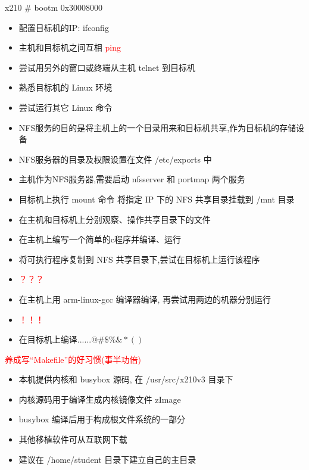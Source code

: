    x210 \# bootm 0x30008000
\endslide

\begin{itemize}
  \item 配置目标机的IP: ifconfig
  \item 主机和目标机之间互相 \textcolor{red}{ping}
  \item 尝试用另外的窗口或终端从主机 telnet 到目标机
  \item 熟悉目标机的 Linux 环境
  \item 尝试运行其它 Linux 命令
\end{itemize}
\endslide

\begin{itemize}
  \item NFS服务的目的是将主机上的一个目录用来和目标机共享,作为目标机的存储设备
  \item NFS服务器的目录及权限设置在文件 /etc/exports 中
  \item 主机作为NFS服务器,需要启动 nfsserver 和 portmap 两个服务
  \item 目标机上执行 mount 命令 将指定 IP 下的 NFS 共享目录挂载到 /mnt 目录
  \item 在主机和目标机上分别观察、操作共享目录下的文件
\end{itemize}
\endslide

\begin{itemize}
  \item 在主机上编写一个简单的c程序并编译、运行
  \item 将可执行程序复制到 NFS 共享目录下,尝试在目标机上运行该程序
  \item \textcolor{red}{？？？}
  \item 在主机上用 arm-linux-gcc 编译器编译, 再尝试用两边的机器分别运行
  \item \textcolor{red}{！！！}
  \item 在目标机上编译......$\! @\#\$\%\&*()$
\end{itemize}
\textcolor{red}{养成写``Makefile''的好习惯(事半功倍)}
\endslide

\begin{itemize}
  \item 本机提供内核和 busybox 源码, 在 /usr/src/x210v3 目录下
  \item 内核源码用于编译生成内核镜像文件 zImage
  \item busybox 编译后用于构成根文件系统的一部分
  \item 其他移植软件可从互联网下载
  \item 建议在 /home/student 目录下建立自己的主目录
\end{itemize}
\endslide

